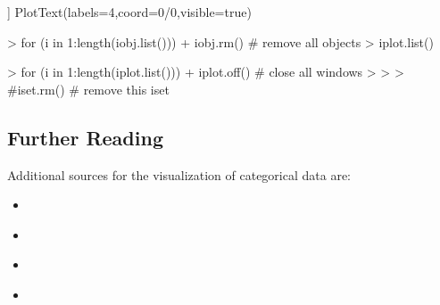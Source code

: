 \documentclass[12pt,letterpaper,final]{article}
\begin{document}
\begin{Schunk}
\begin{Soutput}
[[2]]
PlotText(labels=4,coord=0/0,visible=true) 
\end{Soutput}
\begin{Sinput}
> for (i in 1:length(iobj.list())) 
+   iobj.rm() # remove all objects
> iplot.list()
\end{Sinput}
\begin{Sinput}
> for (i in 1:length(iplot.list()))
+   iplot.off() # close all windows
> 
> 
> #iset.rm() # remove this iset
\end{Sinput}
\end{Schunk}


\newpage


\subsection{Further Reading}

Additional sources for the visualization of categorical data are:

\begin{itemize}
\item \cite{BG98}

\item \cite{Fr2000VCD}

\item \cite{Hof2007}

\item \cite{TU2009}

\end{itemize}


~\\[0.5in]

\end{document}
